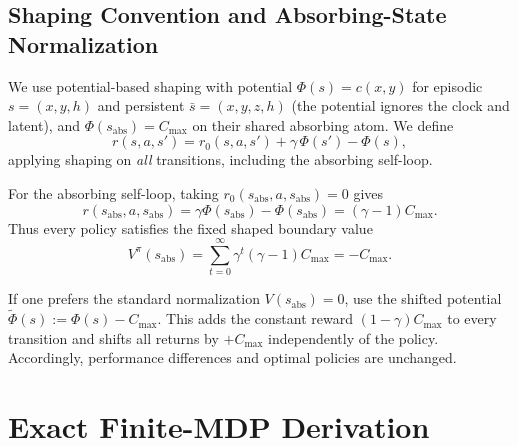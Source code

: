 \documentclass{article}
\theoremstyle{plain}
\theoremstyle{definition}
\theoremstyle{remark}
\begin{document}
\subsection{Shaping Convention and Absorbing-State Normalization}
\label{app:shaping_convention}

We use potential-based shaping with potential $\Phi(s)=c(x,y)$ for episodic $s=(x,y,h)$ and persistent $\bar s=(x,y,z,h)$ (the potential ignores the clock and latent), and $\Phi(s_{\mathrm{abs}})=C_{\max}$ on their shared absorbing atom. We define
\begin{equation}
r(s,a,s')
=
r_0(s,a,s')
+
\gamma\,\Phi(s')-\Phi(s),
\end{equation}
applying shaping on \emph{all} transitions, including the absorbing self-loop.

For the absorbing self-loop, taking $r_0(s_{\mathrm{abs}},a,s_{\mathrm{abs}})=0$ gives
\[
r(s_{\mathrm{abs}},a,s_{\mathrm{abs}})
=
\gamma \Phi(s_{\mathrm{abs}})-\Phi(s_{\mathrm{abs}})
=
(\gamma-1)C_{\max}.
\]
Thus every policy satisfies the fixed shaped boundary value
\[
V^\pi(s_{\mathrm{abs}})
=
\sum_{t=0}^\infty \gamma^t (\gamma-1)C_{\max}
=
-C_{\max}.
\]

If one prefers the standard normalization $V(s_{\mathrm{abs}})=0$, use the shifted potential
$\tilde{\Phi}(s):=\Phi(s)-C_{\max}$.
This adds the constant reward $(1-\gamma)C_{\max}$ to every transition and shifts all returns by $+C_{\max}$ independently of the policy.
Accordingly, performance differences and optimal policies are unchanged.

\section{Exact Finite-MDP Derivation}
\label{app:finite_mdp_derivation}
\end{document}
